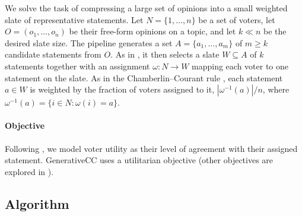 \documentclass[letterpaper]{article} %
\begin{document}
We solve the task of compressing a large set of opinions into a small weighted slate of representative statements.
Let \(N=\{1,\ldots,n\}\) be a set of voters, let \(O=(o_1,\ldots,o_n)\) be their free-form opinions on a topic, and let \(k \ll n\) be the desired slate size.
The pipeline generates a set \(A=\{a_1,\ldots,a_m\}\) of \(m \ge k\) candidate statements from \(O\).
As in \citet{fish-v2}, it then selects a slate \(W\subseteq A\) of \(k\) statements together with an assignment \(\omega:N\to W\) mapping each voter to one statement on the slate.
As in the Chamberlin--Courant rule \citep{chamberlin-courant, skowron-2015}, each statement \(a\in W\) is weighted by the fraction of voters assigned to it, \(|\omega^{-1}(a)|/n\), where \(\omega^{-1}(a)=\{i\in N:\omega(i)=a\}\).

\paragraph{Objective}
Following \citet{chamberlin-courant,fish-v2}, we model voter utility as their level of agreement with their assigned statement.
GenerativeCC uses a utilitarian objective (other objectives are explored in ).

\subsection{Algorithm}
\end{document}
